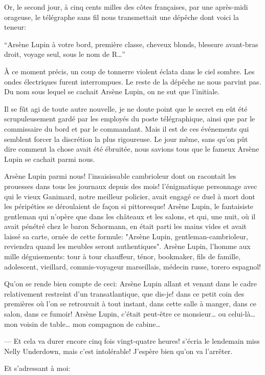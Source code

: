 \documentclass[12pt,a4paper]{article}
\begin{document}
Or, le second jour, à cinq cents milles des côtes françaises, par une après-midi orageuse, le télégraphe sans fil nous transmettait une dépêche dont voici la teneur:

\enquote{Arsène Lupin à votre bord, première classe, cheveux blonds, blessure avant-bras droit, voyage seul, sous le nom de R…}

À ce moment précis, un coup de tonnerre violent éclata dans le ciel sombre. Les ondes électriques furent interrompues. Le reste de la dépêche ne nous parvint pas. Du nom sous lequel se cachait Arsène Lupin, on ne sut que l’initiale.

Il se fût agi de toute autre nouvelle, je ne doute point que le secret en eût été scrupuleusement gardé par les employés du poste télégraphique, ainsi que par le commissaire du bord et par le commandant. Mais il est de ces événements qui semblent forcer la discrétion la plus rigoureuse. Le jour même, sans qu’on pût dire comment la chose avait été ébruitée, nous savions tous que le fameux Arsène Lupin se cachait parmi nous.

Arsène Lupin parmi nous! l’insaisissable cambrioleur dont on racontait les prouesses dans tous les journaux depuis des mois! l’énigmatique personnage avec qui le vieux Ganimard, notre meilleur policier, avait engagé ce duel à mort dont les péripéties se déroulaient de façon si pittoresque! Arsène Lupin, le fantaisiste gentleman qui n’opère que dans les châteaux et les salons, et qui, une nuit, où il avait pénétré chez le baron Schormann, en était parti les mains vides et avait laissé sa carte, ornée de cette formule: "Arsène Lupin, gentleman-cambrioleur, reviendra quand les meubles seront authentiques". Arsène Lupin, l’homme aux mille déguisements: tour à tour chauffeur, ténor, bookmaker, fils de famille, adolescent, vieillard, commis-voyageur marseillais, médecin russe, torero espagnol!

Qu’on se rende bien compte de ceci: Arsène Lupin allant et venant dans le cadre relativement restreint d’un transatlantique, que dis-je! dans ce petit coin des premières où l’on se retrouvait à tout instant, dans cette salle à manger, dans ce salon, dans ce fumoir! Arsène Lupin, c’était peut-être ce monsieur… ou celui-là… mon voisin de table… mon compagnon de cabine…

— Et cela va durer encore cinq fois vingt-quatre heures! s’écria le lendemain miss Nelly Underdown, mais c’est intolérable! J’espère bien qu’on va l’arrêter. 

Et s’adressant à moi:
\end{document}
